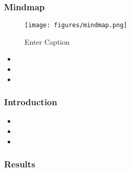 \documentclass[10pt,letterpaper]{article}
\newcommand{\bi}{\begin{itemize}}
\newcommand{\ei}{\end{itemize}}
\begin{document}
\subsubsection{Mindmap}

\begin{figure}
    \centering
    \texttt{[image: figures/mindmap.png]}
    \caption{Enter Caption}
    \label{fig:enter-label}
\end{figure}


\bi
    \item  
    \item  
    \item  
\ei


\subsubsection{Introduction}
\label{ssubsec:new-ideas:Intro}


\bi
    \item  
    \item  
    \item  
\ei

\subsubsection{Results}
\label{ssubsec:new-ideas:Results}
\end{document}
